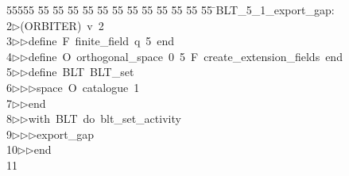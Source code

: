 %
%
\begin{tabbing}
55555 \= 55 \= 55 \= 55 \= 55 \= 55 \= 55 \= 55 \= 55 \= 55 \= 55 \= 55 \= 55 \= \>BLT\_5\_1\_export\_gap:\\[0pt]
2\>$\triangleright$\>(ORBITER)\ v\ 2\ \\[0pt]
3\>$\triangleright$\>$\triangleright$\>define\ F\ finite\_field\ q\ 5\ end\ \\[0pt]
4\>$\triangleright$\>$\triangleright$\>define\ O\ orthogonal\_space\ 0\ 5\ F\ create\_extension\_fields\ end\ \\[0pt]
5\>$\triangleright$\>$\triangleright$\>define\ BLT\ BLT\_set\ \\[0pt]
6\>$\triangleright$\>$\triangleright$\>$\triangleright$\>space\ O\ catalogue\ 1\ \\[0pt]
7\>$\triangleright$\>$\triangleright$\>end\ \\[0pt]
8\>$\triangleright$\>$\triangleright$\>with\ BLT\ do\ blt\_set\_activity\ \\[0pt]
9\>$\triangleright$\>$\triangleright$\>$\triangleright$\>export\_gap\ \\[0pt]
10\>$\triangleright$\>$\triangleright$\>end\\[0pt]
11\>\end{tabbing}
